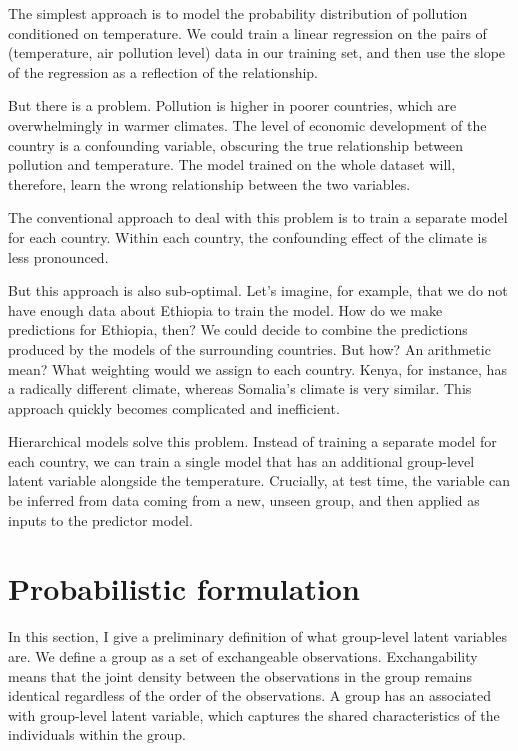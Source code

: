 \documentclass[../thesis.tex]{subfiles}
\begin{document}
The simplest approach is to model the probability distribution of pollution conditioned on temperature. We could train a linear regression on the pairs of (temperature, air pollution level) data in our training set, and then use the slope of the regression as a reflection of the relationship. 


But there is a problem. Pollution is higher in poorer countries, which are overwhelmingly in warmer climates. The level of economic development of the country is a confounding variable, obscuring the true relationship between pollution and temperature. The model trained on the whole dataset will, therefore, learn the wrong relationship between the two variables. 

The conventional approach to deal with this problem is to train a separate model for each country. Within each country, the confounding effect of the climate is less pronounced.

But this approach is also sub-optimal. Let's imagine, for example, that we do not have enough data about Ethiopia to train the model. How do we make predictions for Ethiopia, then? We could decide to combine the predictions produced by the models of the surrounding countries. But how? An arithmetic mean? What weighting would we assign to each country. Kenya, for instance, has a radically different climate, whereas Somalia's climate is very similar. This approach quickly becomes complicated and inefficient.

Hierarchical models solve this problem. Instead of training a separate model for each country, we can train a single model that has an additional group-level latent variable alongside the temperature. Crucially, at test time, the variable can be inferred from data coming from a new, unseen group, and then applied as inputs to the predictor model.

\section{Probabilistic formulation} 

In this section, I give a preliminary definition of what group-level latent variables are. We define a group as a set of exchangeable observations. Exchangability means that the joint density between the observations in the group remains identical regardless of the order of the observations. A group has an associated with group-level latent variable, which captures the shared characteristics of the individuals within the group.
\end{document}
